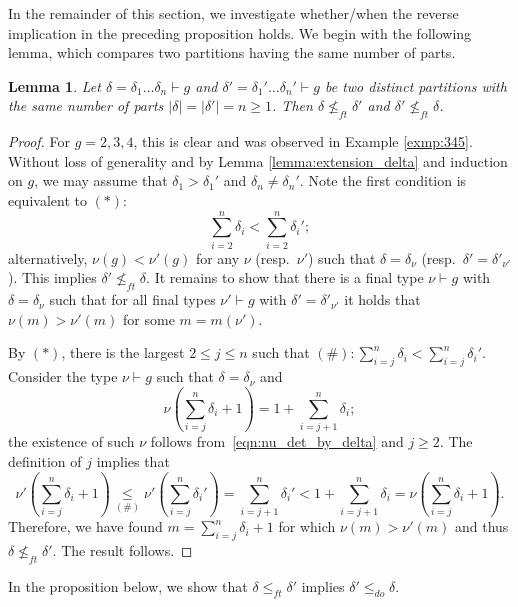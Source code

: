 \documentclass[11pt]{amsart}
\numberwithin{equation}{section}
\theoremstyle{plain}
\newcommand{\<}{\left \langle}
\renewcommand{\>}{\right \rangle}
\newtheorem{lem}[thm]{Lemma}
\theoremstyle{definition}
\theoremstyle{remark}
\begin{document}
In the remainder of this section, we investigate whether/when the reverse implication in the preceding proposition holds. We begin with the following lemma, which compares two partitions having the same number of parts.
 
\begin{lem}
Let $\delta = \delta_1\ldots\delta_n \vdash g$ and $\delta' = \delta_1'\ldots\delta_n' \vdash g$ be two distinct partitions with the same number of parts $|\delta| = |\delta'| = n \geq 1$. Then ${\delta} \not \leq_{ft} {\delta'}$ and ${\delta'} \not \leq_{ft} {\delta}$.
\label{lem:sameparts}
\end{lem}

\begin{proof}
For $g = 2, 3, 4$, this is clear and was observed in Example \ref{exmp:345}. Without loss of generality and by Lemma \ref{lemma:extension_delta} and induction on $g$, we may assume that $\delta_1>\delta_1'$ and $\delta_n \neq \delta_n'$. 
Note the first condition is equivalent to $(*)$: $$\sum_{i = 2}^n\delta_i<\sum_{i = 2}^n\delta_i';$$ alternatively, $\nu(g) < \nu'(g)$ for any $\nu$ (resp.~$\nu'$) such that $\delta = \delta_{\nu}$ (resp.~$\delta' = \delta'_{\nu'}$). This implies $\delta' \not \leq_{ft} \delta$. 
It remains to show that there is a final type $\nu \vdash g$ with $\delta = \delta_{\nu}$ such that for all final types $\nu' \vdash g$ with $\delta' = \delta'_{\nu'}$ it holds that $\nu(m)>\nu'(m)$ for some $m = m(\nu')$.

By $(*)$, there is the largest $2\leq j\leq n$ such that $(\#): \sum_{i = j}^n\delta_i<\sum_{i = j}^n\delta_i'$. 
Consider the type $\nu\vdash g$ such that $\delta = \delta_{\nu}$ and $$\nu(\sum_{i = j}^n\delta_i + 1) = 1 + \sum_{i = j+1}^n\delta_i;$$ the existence of such $\nu$ follows from~\eqref{eqn:nu_det_by_delta} and $j \geq 2$.
The definition of $j$ implies that $$\nu'(\sum_{i = j}^n\delta_i + 1)\underset{(\#)}{\leq} \nu'(\sum_{i = j}^n\delta_i') = \sum_{i = j+1}^n\delta_i' < 1 + \sum_{i = j+1}^n\delta_i = \nu(\sum_{i = j}^n\delta_i + 1). $$ Therefore, we have found $m = \sum_{i = j}^n\delta_i + 1$ for which $\nu(m) > \nu'(m)$ and thus $\delta \not \leq_{ft} \delta'$. The result follows.
\end{proof}

In the proposition below, we show that $\delta \leq_{ft} \delta'$ implies $\delta' \leq_{do} \delta$. 
\end{document}
